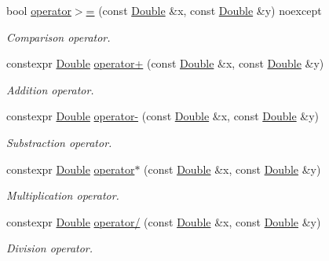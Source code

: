 \begin{DoxyCompactItemize}
bool \hyperlink{class_mdt_1_1_numeric_1_1_double_a822da7020b9c5b5ba219279370dd4b53}{operator$>$=} (const \hyperlink{class_mdt_1_1_numeric_1_1_double}{Double} \&x, const \hyperlink{class_mdt_1_1_numeric_1_1_double}{Double} \&y) noexcept
\begin{DoxyCompactList}\small\item\em Comparison operator. \end{DoxyCompactList}\item 
constexpr \hyperlink{class_mdt_1_1_numeric_1_1_double}{Double} \hyperlink{class_mdt_1_1_numeric_1_1_double_af6a54c32fbafaa79568730a97103c38e}{operator+} (const \hyperlink{class_mdt_1_1_numeric_1_1_double}{Double} \&x, const \hyperlink{class_mdt_1_1_numeric_1_1_double}{Double} \&y)
\begin{DoxyCompactList}\small\item\em Addition operator. \end{DoxyCompactList}\item 
constexpr \hyperlink{class_mdt_1_1_numeric_1_1_double}{Double} \hyperlink{class_mdt_1_1_numeric_1_1_double_afb923d564cd42ca2f907c76d306cdc90}{operator-\/} (const \hyperlink{class_mdt_1_1_numeric_1_1_double}{Double} \&x, const \hyperlink{class_mdt_1_1_numeric_1_1_double}{Double} \&y)
\begin{DoxyCompactList}\small\item\em Substraction operator. \end{DoxyCompactList}\item 
constexpr \hyperlink{class_mdt_1_1_numeric_1_1_double}{Double} \hyperlink{class_mdt_1_1_numeric_1_1_double_ad3f5b004c88e16638aa828b20d72177d}{operator$\ast$} (const \hyperlink{class_mdt_1_1_numeric_1_1_double}{Double} \&x, const \hyperlink{class_mdt_1_1_numeric_1_1_double}{Double} \&y)
\begin{DoxyCompactList}\small\item\em Multiplication operator. \end{DoxyCompactList}\item 
constexpr \hyperlink{class_mdt_1_1_numeric_1_1_double}{Double} \hyperlink{class_mdt_1_1_numeric_1_1_double_ab2ce0cd07e13714fe2917478b67db3e8}{operator/} (const \hyperlink{class_mdt_1_1_numeric_1_1_double}{Double} \&x, const \hyperlink{class_mdt_1_1_numeric_1_1_double}{Double} \&y)
\begin{DoxyCompactList}\small\item\em Division operator. \end{DoxyCompactList}\end{DoxyCompactItemize}


